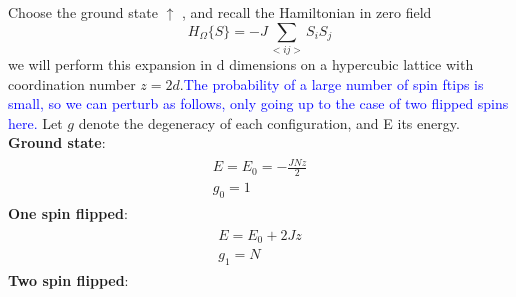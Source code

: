 \documentclass[12pt,titlepage]{article}
\numberwithin{equation}{section}
\begin{document}
Choose the ground state $\uparrow$ , and recall the Hamiltonian in zero field 
\begin{equation}
H_{\Omega}\{S\}=-J \sum_{<i j>} S_{i} S_{j}
\end{equation}
we will perform this expansion in d dimensions on a hypercubic lattice with coordination number $z = 2d$.\textcolor{blue}{The probability of a large number of spin ftips is small, so we can perturb as follows, only going up to the case of two flipped spins here.} Let $g$ denote the degeneracy of each configuration, and E its energy.
\textbf{Ground state}:
\begin{align*}
    \begin{array}{l}{E=E_{0}=-\frac{J N z}{2}} \\ {g_{0}=1}\end{array}
\end{align*}
\textbf{One spin flipped}:
\begin{align*}
\begin{array}{l}{E=E_{0}+2 J z} \\ {g_{1}=N}\end{array}
\end{align*}
\textbf{Two spin flipped}:
\end{document}
